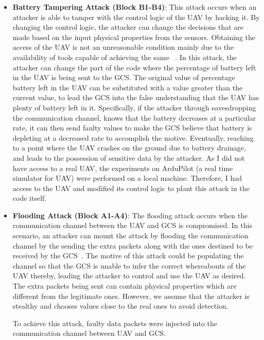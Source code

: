 \begin{itemize}
\item {\bf Battery Tampering Attack (Block B1-B4)}: This attack occurs when an attacker is able to tamper with the control logic of the \ac{UAV} by hacking it. By changing the control logic, the attacker can change the decisions that are made based on the input physical properties from the sensors. Obtaining the access of the \ac{UAV} is not an unreasonable condition mainly due to the availability of tools capable of achieving the same ~\cite{pleban2014hacking, rodday2016exploring}.
In this attack, the attacker can change the part of the code where the percentage of battery left in the \ac{UAV} is being sent to the \ac{GCS}. The original value of percentage battery left in the \ac{UAV} can be substituted with a value greater than the current value, to lead the \ac{GCS} into the false understanding that the \ac{UAV} has plenty of battery left in it. Specifically, if the attacker through eavesdropping the communication channel, knows that the battery decreases at a particular rate, it can then send faulty values to make the \ac{GCS} believe that battery is depleting at a decreased rate to accomplish the motive. Eventually, reaching to a point where the \ac{UAV} crashes on the ground due to battery drainage, and leads to the possession of sensitive data by the attacker. As I did not have access to a real \ac{UAV}, the experiments on ArduPilot (a real time simulator for \ac{UAV}) were performed on a local machine. Therefore, I had access to the \ac{UAV} and modified its control logic to plant this attack in the code itself.

\item {\bf Flooding Attack (Block A1-A4)}: The flooding attack occurs when the communication channel between the \ac{UAV} and \ac{GCS} is compromised. In this scenario, an attacker can mount the attack by flooding the communication channel by the sending the extra packets along with the ones destined to be received by the \ac{GCS}~\cite{pleban2014hacking}. The motive of this attack could be populating the channel so that the \ac{GCS} is unable to infer the correct whereabouts of the \ac{UAV} thereby, leading the attacker to control and use the \ac{UAV} as desired. The extra packets being sent can contain physical properties which are different from the legitimate ones. However, we assume that the attacker is stealthy and chooses values close to the real ones to avoid detection. 

To achieve this attack, faulty data packets were injected into the communication channel between \ac{UAV} and \ac{GCS}.


\end{itemize}
